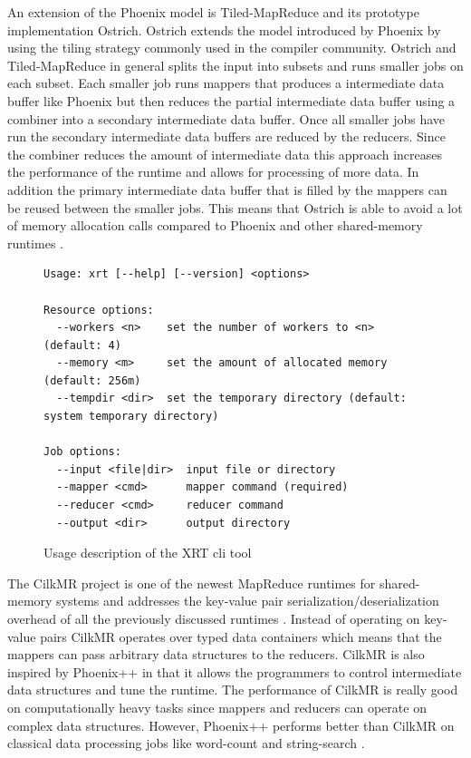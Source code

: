 \documentclass[twocolumn,11px]{article}       %
\begin{document}
An extension of the Phoenix model is Tiled-MapReduce and its prototype
implementation Ostrich. Ostrich extends the model introduced by Phoenix by using
the tiling strategy commonly used in the compiler community. Ostrich and
Tiled-MapReduce in general splits the input into subsets and runs smaller jobs on each
subset. Each smaller job runs mappers that produces a intermediate data buffer
like Phoenix but then reduces the partial intermediate data buffer using a
combiner into a secondary intermediate data buffer. Once all smaller jobs have
run the secondary intermediate data buffers are reduced by the reducers. Since
the combiner reduces the amount of intermediate data this approach increases the
performance of the runtime and allows for processing of more data. In addition
the primary intermediate data buffer that is filled by the mappers can be reused
between the smaller jobs. This means that Ostrich is able to avoid a lot of
memory allocation calls compared to Phoenix and other shared-memory runtimes
\cite{Ostrich}.

\begin{figure}[h]
\begin{lstlisting}
Usage: xrt [--help] [--version] <options>

Resource options:
  --workers <n>    set the number of workers to <n> (default: 4)
  --memory <m>     set the amount of allocated memory (default: 256m)
  --tempdir <dir>  set the temporary directory (default: system temporary directory)

Job options:
  --input <file|dir>  input file or directory
  --mapper <cmd>      mapper command (required)
  --reducer <cmd>     reducer command
  --output <dir>      output directory
\end{lstlisting}
\caption{Usage description of the XRT cli tool}
\label{fig:xrt}
\end{figure}

The CilkMR project is one of the newest MapReduce runtimes for shared-memory
systems and addresses the key-value pair serialization/deserialization overhead
of all the previously discussed runtimes \cite{CilkMR}. Instead of operating on
key-value pairs CilkMR operates over typed data containers which means that the
mappers can pass arbitrary data structures to the reducers. CilkMR is also
inspired by Phoenix++ in that it allows the programmers to control intermediate
data structures and tune the runtime. The performance of CilkMR is really good
on computationally heavy tasks since mappers and reducers can operate on complex
data structures. However, Phoenix++ performs better than CilkMR on classical
data processing jobs like word-count and string-search \cite{CilkMR} \cite{GoogleMapReduce}.
\end{document}
